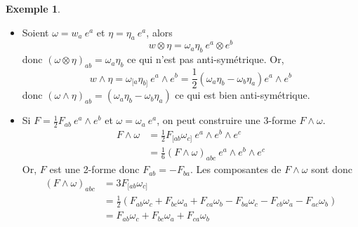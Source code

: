 \documentclass[a4paper,11pt]{report}
\theoremstyle{definition}
\theoremstyle{plain}
\theoremstyle{definition}
\newtheorem{exmp}{Exemple}[chapter]
\theoremstyle{remark}
\begin{document}
            \begin{exmp}${}$\\
            \begin{itemize}[label = \textbullet]
                \item Soient $\omega = w_a ~e^a$ et $\eta = \eta_a ~e^a$, alors
                    \begin{equation}
                        w\otimes\eta = \omega_a\eta_b~ e^a\otimes e^b
                    \end{equation}
                    donc $(\omega\otimes\eta)_{ab} =\omega_a\eta_b$ ce qui n'est pas anti-symétrique. Or,
                    \begin{equation}
                        w\wedge\eta = \omega_{[a}\eta_{b]}~e^a\wedge e^b = \frac{1}{2}(\omega_a \eta_b-\omega_b\eta_a)e^a\wedge e^b
                    \end{equation}
                    donc $(\omega\wedge\eta)_{ab} =(\omega_a\eta_b-\omega_b\eta_a)$ ce qui est bien anti-symétrique.
                \item Si $F = \frac{1}{2} F_{ab}~e^a\wedge e^b$ et $\omega = \omega_a~ e^a$, on peut construire une 3-forme $F\wedge\omega$.
                \begin{align}
                    F\wedge\omega &= \frac{1}{2}F_{[ab}\omega_{c]}~e^a\wedge e^b \wedge e^c\\
                    &= \frac{1}{6}(F\wedge\omega)_{abc}~e^a\wedge e^b \wedge e^c
                \end{align}
                Or, $F$ est une 2-forme donc $F_{ab} = -F_{ba}$. Les composantes de $F\wedge\omega$ sont donc
                \begin{align}
                    (F\wedge\omega)_{abc} &= 3 F_{[ab}\omega_{c]}\\
                    &= \frac{1}{2}\left(F_{ab}\omega_c+F_{bc}\omega_a+F_{ca}\omega_b-F_{ba}\omega_c-F_{cb}\omega_a-F_{ac}\omega_b\right)\\
                    &= F_{ab}\omega_c+F_{bc}\omega_a+F_{ca}\omega_b
                \end{align}
            \end{itemize}
            \end{exmp}
            
\end{document}
